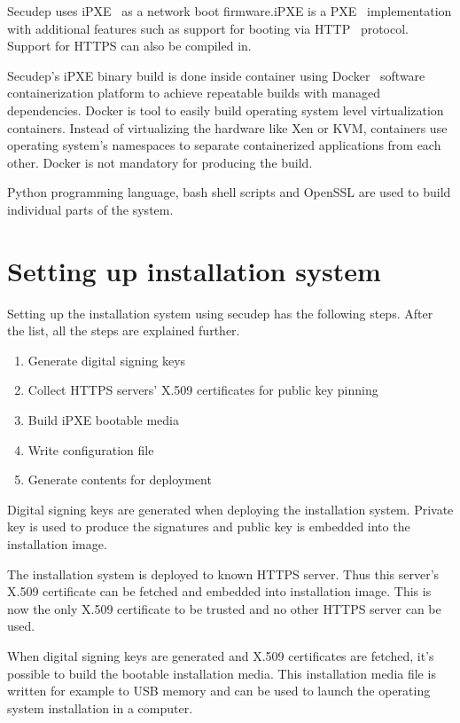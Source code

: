 Secudep uses iPXE~\cite{iPXE} as a network boot firmware.\@ iPXE is a
PXE~\cite{PXEspec} implementation with additional features such as
support for booting via HTTP~\cite{RFC2616} protocol. Support for
HTTPS can also be compiled in.\@

Secudep's iPXE binary build is done inside container using
Docker~\cite{Docker} software containerization platform to achieve
repeatable builds with managed dependencies. Docker is tool to easily
build operating system level virtualization~\cite{Soltesz2007}
containers. Instead of virtualizing the hardware like Xen or KVM,
containers use operating system's namespaces to separate containerized
applications from each other. Docker is not mandatory for producing
the build.

Python programming language, bash shell scripts and OpenSSL are used
to build individual parts of the system.

\section{Setting up installation system}

Setting up the installation system using secudep has the following
steps. After the list, all the steps are explained further.

\begin{enumerate}
  \item Generate digital signing keys
  \item Collect HTTPS servers' X.509 certificates for public key pinning
  \item Build iPXE bootable media
  \item Write configuration file
  \item Generate contents for deployment
\end{enumerate}

Digital signing keys are generated when deploying the installation
system. Private key is used to produce the signatures and
public key is embedded into the installation image.

The installation system is deployed to known HTTPS server. Thus this
server's X.509 certificate can be fetched and embedded into
installation image. This is now the only X.509 certificate to be
trusted and no other HTTPS server can be used.

When digital signing keys are generated and X.509 certificates are
fetched, it's possible to build the bootable installation media. This
installation media file is written for example to USB memory and can
be used to launch the operating system installation in a computer.

